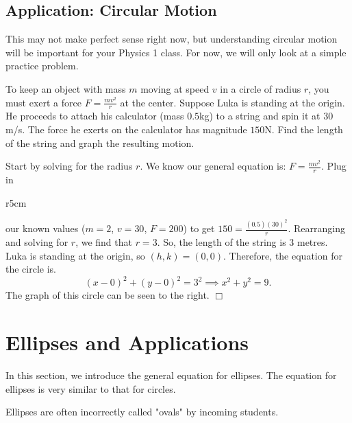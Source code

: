 \documentclass[../book.tex]{subfiles}
\begin{document}
\subsection{Application: Circular Motion}
\noindent This may not make perfect sense right now, but understanding circular motion will be important for your Physics 1 class.  For now, we will only look at a simple practice problem.
\begin{example}
To keep an object with mass $m$ moving at speed $v$ in a circle of radius $r$, you must exert a force $F = \frac{mv^2}{r}$ at the center.  Suppose Luka is standing at the origin.  He proceeds to attach his calculator (mass $0.5$kg) to a string and spin it at $30$m/s.  The force he exerts on the calculator has magnitude $150$N.  Find the length of the string and graph the resulting motion.
\end{example}
\begin{solution}
Start by solving for the radius $r$.  We know our general equation is: $F = \frac{mv^2}{r}$.  Plug in 
\end{solution}

\begin{wrapfigure}{r}{5cm}
\end{wrapfigure}

\noindent our known values ($m=2$, $v=30$, $F=200$) to get  $150 = \frac{(0.5)(30)^2}{r}$.  Rearranging and solving for $r$, we find that $r=3$.
So, the length of the string is $3$ metres.  Luka is standing at the origin, so $(h,k)=(0,0)$.  Therefore, the equation for the circle is.
$$ (x-0)^2 + (y-0)^2 = 3^2\implies x^2+y^2 = 9.$$
The graph of this circle can be seen to the right. $\Box$

\section{Ellipses and Applications}
\noindent In this section, we introduce the general equation for ellipses.  The equation for ellipses is very similar to that for circles. 

\begin{remark}
Ellipses are often incorrectly called "ovals" by incoming students.
\end{remark}
\end{document}
